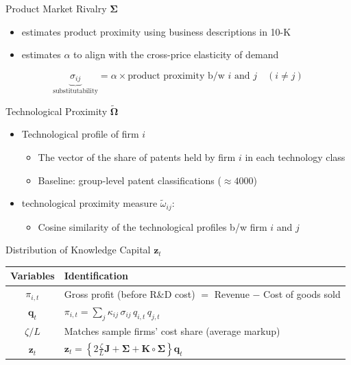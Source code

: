 \documentclass[
  10pt,
  aspectratio=169,   %
]{beamer}
\theoremstyle{plain}
\begin{document}
\begin{frame}{Product Market Rivalry $\bm{\Sigma}$}
  \label{product_identification}
  \begin{itemize}
    \item \citet{Hoberg2016-jm} estimates product proximity using business descriptions in 10-K
    \medskip{}
    \item \citet{Pellegrino2024-dn} estimates $\alpha$ to align with the cross-price elasticity of demand \hyperlink{micro_vs_ghl}{}
  \end{itemize}
  \medskip{}
  \[
    \underbrace{\sigma_{ij}}_{\text{substitutability}}=\alpha\times\text{product proximity b/w }i\text{ and }j\quad\left(i\neq j\right)
  \]
\end{frame}

\begin{frame}{Technological Proximity $\widetilde{\bm{\Omega}}$}
  \begin{itemize}
    \item Technological profile of firm $i$
    \begin{itemize}
      \item The vector of the share of patents held by firm $i$ in each technology class
      \item Baseline: group-level patent classifications ($\approx4000$)
      \medskip{}
    \end{itemize}
    \medskip{}
    \item \citet{Jaffe1986-yz} technological proximity measure $\tilde{\omega}_{ij}$:
    \begin{itemize}
      \item Cosine similarity of the technological profiles b/w firm $i$ and $j$
    \end{itemize}
  \end{itemize}
\end{frame}

\begin{frame}{Distribution of Knowledge Capital $\bm{z}_t$}
  \begin{table}[htbp]
    \centering
    \begin{tabular}{cl}
      \toprule
      Variables & Identification \\
      \midrule
      $\pi_{i,t}$
      & Gross profit (before R\&D cost)
      $=$ Revenue $-$ Cost of goods sold \\[6pt]
      $\bm{q}_t$
      &
      $\pi_{i,t}=\displaystyle\sum_{j}\kappa_{ij}\,\sigma_{ij}\,q_{i,t}\,q_{j,t}$ \\[6pt]
      $\zeta/L$
      & Matches sample firms' cost share (average markup) \\[6pt]
      $\bm{z}_t$
      &
      $\displaystyle \bm{z}_{t}
      =\left\{2\frac{\zeta}{L}\bm{J}+\bm{\Sigma}+\bm{K}\circ\bm{\Sigma}\right\}\bm{q}_{t}$ \\
      \bottomrule
    \end{tabular}
  \end{table}
\end{frame}
\end{document}
